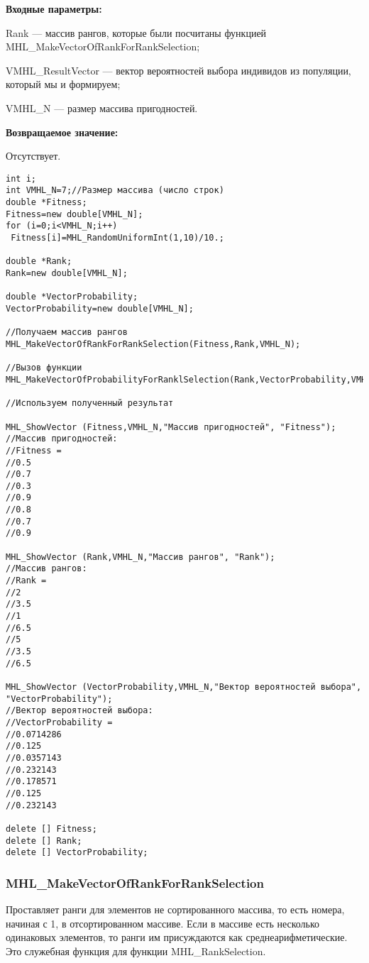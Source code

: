 \documentclass[a4paper,12pt]{article}
\begin{document}
\textbf{Входные параметры:}  
 
Rank --- массив рангов, которые были посчитаны функцией MHL\_MakeVectorOfRankForRankSelection;
 
VMHL\_ResultVector --- вектор вероятностей выбора индивидов из популяции, который мы и формируем;
 
VMHL\_N --- размер массива пригодностей.

\textbf{Возвращаемое значение:}

 Отсутствует.


\begin{lstlisting}[label=code_use_MHL_MakeVectorOfProbabilityForRanklSelection,caption=Пример использования]
int i;
int VMHL_N=7;//Размер массива (число строк)
double *Fitness;
Fitness=new double[VMHL_N];
for (i=0;i<VMHL_N;i++)
 Fitness[i]=MHL_RandomUniformInt(1,10)/10.;

double *Rank;
Rank=new double[VMHL_N];

double *VectorProbability;
VectorProbability=new double[VMHL_N];

//Получаем массив рангов
MHL_MakeVectorOfRankForRankSelection(Fitness,Rank,VMHL_N);

//Вызов функции
MHL_MakeVectorOfProbabilityForRanklSelection(Rank,VectorProbability,VMHL_N);

//Используем полученный результат

MHL_ShowVector (Fitness,VMHL_N,"Массив пригодностей", "Fitness");
//Массив пригодностей:
//Fitness =
//0.5
//0.7
//0.3
//0.9
//0.8
//0.7
//0.9

MHL_ShowVector (Rank,VMHL_N,"Массив рангов", "Rank");
//Массив рангов:
//Rank =
//2
//3.5
//1
//6.5
//5
//3.5
//6.5

MHL_ShowVector (VectorProbability,VMHL_N,"Вектор вероятностей выбора", "VectorProbability");
//Вектор вероятностей выбора:
//VectorProbability =
//0.0714286
//0.125
//0.0357143
//0.232143
//0.178571
//0.125
//0.232143

delete [] Fitness;
delete [] Rank;
delete [] VectorProbability;
\end{lstlisting}

\subsubsection{MHL\_MakeVectorOfRankForRankSelection}\label{MHL_MakeVectorOfRankForRankSelection}

Проставляет ранги для элементов не сортированного массива, то есть номера, начиная с 1, в отсортированном массиве.  Если в массиве есть несколько одинаковых элементов, то ранги им присуждаются как среднеарифметические. Это служебная функция для функции MHL\_RankSelection.
\end{document}
